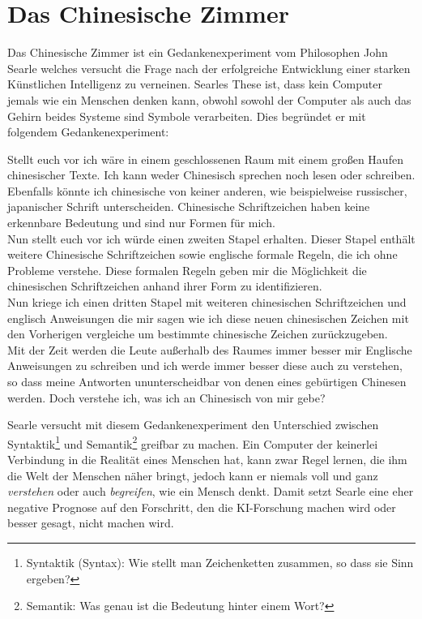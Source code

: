 \documentclass[12pt,german,ngerman]{report}
\begin{document}
    \section{Das Chinesische Zimmer}
    Das Chinesische Zimmer ist ein Gedankenexperiment vom Philosophen John Searle welches
    versucht die Frage nach der erfolgreiche Entwicklung einer starken Künstlichen Intelligenz zu verneinen.
    Searles These ist, dass kein Computer jemals wie ein Menschen denken kann,
    obwohl sowohl der Computer als auch das Gehirn beides Systeme sind Symbole verarbeiten.\cite{nimtz2013chinesische}
    Dies begründet er mit folgendem Gedankenexperiment:
    \begin{displayquote}
        Stellt euch vor ich wäre in einem geschlossenen Raum mit einem großen Haufen chinesischer Texte.
        Ich kann weder Chinesisch sprechen noch lesen oder schreiben.
        Ebenfalls könnte ich chinesische von keiner anderen, wie beispielweise russischer, japanischer Schrift unterscheiden.
        Chinesische Schriftzeichen haben keine erkennbare Bedeutung und sind nur Formen für mich.\\

        Nun stellt euch vor ich würde einen zweiten Stapel erhalten. Dieser Stapel enthält weitere
        Chinesische Schriftzeichen sowie englische formale Regeln, die ich ohne Probleme verstehe.
        Diese formalen Regeln geben mir die Möglichkeit die chinesischen Schriftzeichen
        anhand ihrer Form zu identifizieren.\\

        Nun kriege ich einen dritten Stapel mit weiteren chinesischen Schriftzeichen und englisch Anweisungen die mir sagen wie ich
        diese neuen chinesischen Zeichen mit den Vorherigen vergleiche um bestimmte chinesische Zeichen zurückzugeben.\\

        Mit der Zeit werden die Leute außerhalb des Raumes immer besser mir Englische Anweisungen zu schreiben und
        ich werde immer besser diese auch zu verstehen, so dass meine Antworten ununterscheidbar von denen eines
        gebürtigen Chinesen werden. Doch verstehe ich, was ich an Chinesisch von mir gebe?
        \cite[1]{searle1999chinese}
    \end{displayquote}
    Searle versucht mit diesem Gedankenexperiment den Unterschied zwischen
    Syntaktik\footnote{Syntaktik (Syntax): Wie stellt man Zeichenketten zusammen, so dass sie Sinn ergeben?}
    und Semantik\footnote{Semantik: Was genau ist die Bedeutung hinter einem Wort?}
    greifbar zu machen.
    Ein Computer der keinerlei Verbindung in die Realität eines Menschen hat, kann zwar Regel lernen, die ihm die
    Welt der Menschen näher bringt, jedoch kann er niemals voll und ganz \emph{verstehen} oder auch \emph{begreifen},
    wie ein Mensch denkt. Damit setzt Searle eine eher negative Prognose auf den Forschritt, den die KI-Forschung
    machen wird oder besser gesagt, nicht machen wird.
\end{document}
